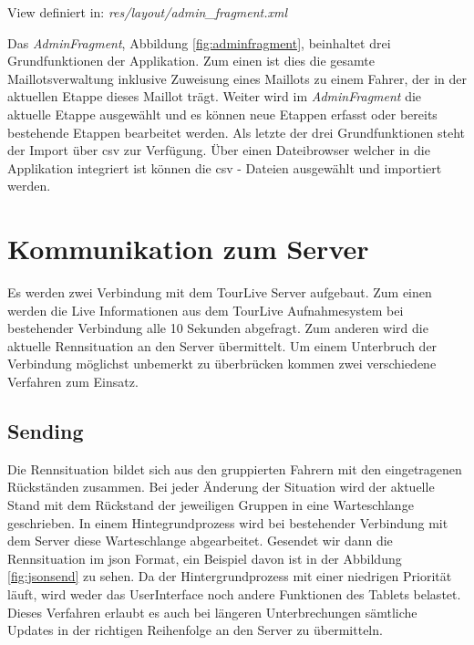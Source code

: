 View definiert in:
\textit{res/layout/admin\_fragment.xml} 

Das \textit{AdminFragment}, Abbildung \ref{fig:adminfragment}, beinhaltet drei Grundfunktionen der Applikation.
Zum einen ist dies die gesamte Maillotsverwaltung inklusive Zuweisung eines Maillots zu einem Fahrer, der in der aktuellen Etappe dieses Maillot trägt.
Weiter wird im \textit{AdminFragment} die aktuelle Etappe ausgewählt und es können neue Etappen erfasst oder bereits bestehende Etappen bearbeitet werden.
Als letzte der drei Grundfunktionen steht der Import über \gls{csv} zur Verfügung. Über einen Dateibrowser welcher in die Applikation integriert ist können die \gls{csv} - Dateien ausgewählt und importiert werden.  

\section{Kommunikation zum Server}
Es werden zwei Verbindung mit dem TourLive Server aufgebaut. Zum einen werden die Live Informationen aus dem TourLive Aufnahmesystem bei bestehender Verbindung alle 10 Sekunden abgefragt. Zum anderen wird die aktuelle Rennsituation an den Server übermittelt. Um einem Unterbruch der Verbindung möglichst unbemerkt zu überbrücken kommen zwei verschiedene Verfahren zum Einsatz.

\subsection{Sending}
Die Rennsituation bildet sich aus den gruppierten Fahrern mit den eingetragenen Rückständen zusammen. Bei jeder Änderung der Situation wird der aktuelle Stand mit dem Rückstand der jeweiligen Gruppen in eine Warteschlange geschrieben. In einem Hintegrundprozess wird bei bestehender Verbindung mit dem Server diese Warteschlange abgearbeitet. Gesendet wir dann die Rennsituation im \gls{json} Format, ein Beispiel davon ist in der Abbildung \ref{fig:jsonsend} zu sehen. Da der Hintergrundprozess mit einer niedrigen Priorität läuft, wird weder das UserInterface noch andere Funktionen des Tablets belastet. Dieses Verfahren erlaubt es auch bei längeren Unterbrechungen sämtliche Updates in der richtigen Reihenfolge an den Server zu übermitteln.
\newpage

